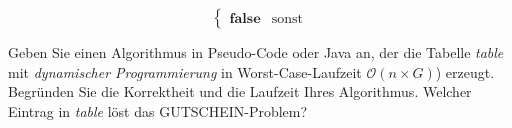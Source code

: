 \documentclass{lehramt-informatik-aufgabe}
\begin{document}
\begin{enumerate}
\begin{liAntwort}
\begin{equation*}
\begin{cases}
\textbf{false} & \text{sonst}
\end{cases}
\end{equation*}
\end{liAntwort}

Geben Sie einen Algorithmus in Pseudo-Code oder Java an, der die Tabelle
\emph{table} mit \emph{dynamischer Programmierung} in
Worst-Case-Laufzeit $\mathcal{O}(n \times G)$) erzeugt. Begründen Sie
die Korrektheit und die Laufzeit Ihres Algorithmus. Welcher Eintrag in
\emph{table} löst das GUTSCHEIN-Problem?

\begin{liAntwort}
\end{liAntwort}

\end{enumerate}
\end{document}
